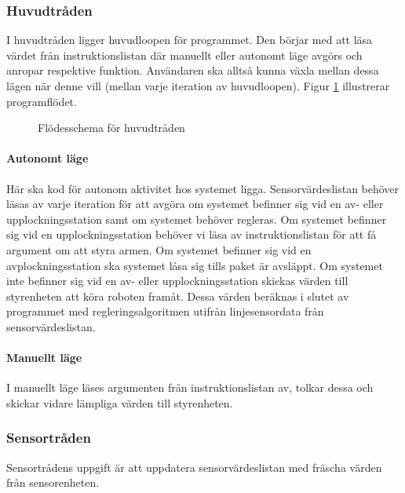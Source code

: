 \subsubsection{Huvudtråden}
I huvudtråden ligger huvudloopen för programmet. Den börjar med att läsa värdet från instruktionslistan där manuellt eller autonomt läge avgörs och anropar respektive funktion. Användaren ska alltså kunna växla mellan dessa lägen när denne vill (mellan varje iteration av huvudloopen). Figur \ref{designspec:huvudmodul-huvudtrad} illustrerar programflödet.

\begin{figure}[H]
\centering
\scalebox{0.6}{}
\caption{Flödesschema för huvudtråden} \label{designspec:huvudmodul-huvudtrad}
\end{figure}

\paragraph{Autonomt läge}
\leavevmode
\newline
\newline
Här ska kod för autonom aktivitet hos systemet ligga. Sensorvärdeslistan behöver läsas av varje iteration för att avgöra om systemet befinner sig vid en av- eller upplockningsstation samt om systemet behöver regleras. Om systemet befinner sig vid en upplockningsstation behöver vi läsa av instruktionslistan för att få argument om att styra armen. Om systemet befinner sig vid en avplockningsstation ska systemet låsa sig tills paket är avsläppt.
\newline
Om systemet inte befinner sig vid en av- eller upplockningsstation skickas värden till styrenheten att köra roboten framåt. Dessa värden beräknas i slutet av programmet med regleringsalgoritmen utifrån linjesensordata från sensorvärdeslistan.

\paragraph{Manuellt läge}
\leavevmode
\newline
\newline
I manuellt läge läses argumenten från instruktionslistan av, tolkar dessa och skickar vidare lämpliga värden till styrenheten.

\subsubsection{Sensortråden}
Sensortrådens uppgift är att uppdatera sensorvärdeslistan med fräscha värden från sensorenheten.

